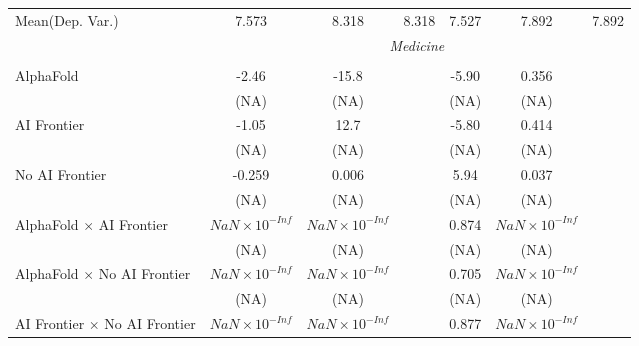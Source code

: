 \begin{tabular}{lcccccc}
Mean(Dep. Var.) & 7.573 & 8.318 & 8.318 & 7.527 & 7.892 & 7.892 \\
 & \multicolumn{6}{c}{\textit{Medicine}} \\ \\
   AlphaFold                                                                  & -2.46                  & -15.8                  &                        & -5.90 & 0.356                  &   \\   
                                                                              & (NA)                   & (NA)                   &                        & (NA)  & (NA)                   &   \\   
   AI Frontier                                                                & -1.05                  & 12.7                   &                        & -5.80 & 0.414                  &   \\   
                                                                              & (NA)                   & (NA)                   &                        & (NA)  & (NA)                   &   \\   
   No AI Frontier                                                             & -0.259                 & 0.006                  &                        & 5.94  & 0.037                  &   \\   
                                                                              & (NA)                   & (NA)                   &                        & (NA)  & (NA)                   &   \\   
   AlphaFold $\times$ AI Frontier                                             & $NaN\times 10^{-Inf}$  & $NaN\times 10^{-Inf}$  &                        & 0.874 & $NaN\times 10^{-Inf}$  &   \\   
                                                                              & (NA)                   & (NA)                   &                        & (NA)  & (NA)                   &   \\   
   AlphaFold $\times$ No AI Frontier                                          & $NaN\times 10^{-Inf}$  & $NaN\times 10^{-Inf}$  &                        & 0.705 & $NaN\times 10^{-Inf}$  &   \\   
                                                                              & (NA)                   & (NA)                   &                        & (NA)  & (NA)                   &   \\   
   AI Frontier $\times$ No AI Frontier                                        & $NaN\times 10^{-Inf}$  & $NaN\times 10^{-Inf}$  &                        & 0.877 & $NaN\times 10^{-Inf}$  &   \\   

\end{tabular}
